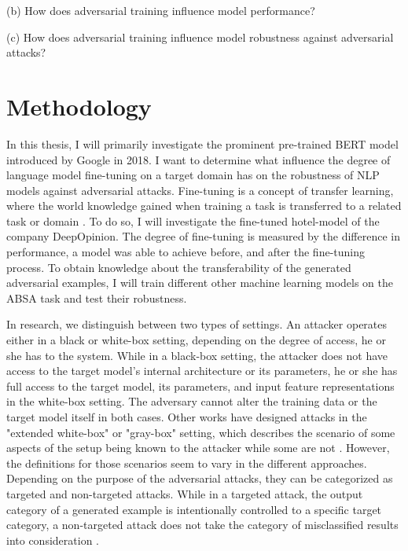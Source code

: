 (b) How does adversarial training influence model performance?

(c) How does adversarial training influence model robustness against adversarial attacks?

\section{Methodology}

In this thesis, I will primarily investigate the prominent pre-trained BERT model introduced by Google in 2018.
I want to determine what influence the degree of language model fine-tuning on a target domain has on the robustness of NLP models against adversarial attacks. Fine-tuning is a concept of transfer learning, where the world knowledge gained when training a task is transferred to a related task or domain \cite{pan2009survey}. To do so, I will investigate the fine-tuned hotel-model of the company DeepOpinion.
The degree of fine-tuning is measured by the difference in performance, a model was able to achieve before, and after the fine-tuning process. 
To obtain knowledge about the transferability of the generated adversarial examples, I will train different other machine learning models on the ABSA task and test their robustness.

In research, we distinguish between two types of settings.
An attacker operates either in a black or white-box setting, depending on the degree of access, he or she has to the system. While in a black-box setting, the attacker does not have access to the target model's internal architecture or its parameters, he or she has full access to the target model, its parameters, and input feature representations in the white-box setting. The adversary cannot alter the training data or the target model itself in both cases. 
Other works have designed attacks in the "extended white-box" or "gray-box" setting, which describes the scenario of some aspects of the setup being known to the attacker while some are not \cite{vivek2018gray}. However, the definitions for those scenarios seem to vary in the different approaches.
Depending on the purpose of the adversarial attacks, they can be categorized as targeted and non-targeted attacks. While in a targeted attack, the output category of a generated example is intentionally controlled to a specific target category, a non-targeted attack does not take the category of misclassified results into consideration \cite{vijayaraghavan2019generating}.

